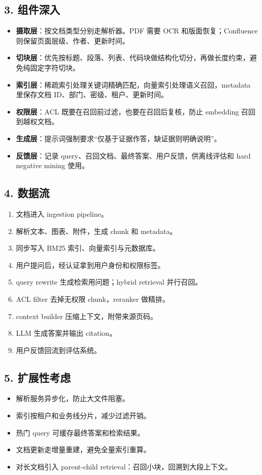 \subsection{3. 组件深入}
\begin{itemize}[leftmargin=2em]
\item \textbf{摄取层}：按文档类型分别走解析器。PDF 需要 OCR 和版面恢复；Confluence 则保留页面层级、作者、更新时间。
\item \textbf{切块层}：优先按标题、段落、列表、代码块做结构化切分，再做长度约束，避免纯固定字符切块。
\item \textbf{索引层}：稀疏索引处理关键词精确匹配，向量索引处理语义召回，metadata 里保存文档 ID、部门、密级、租户、更新时间。
\item \textbf{权限层}：ACL 既要在召回前过滤，也要在召回后复核，防止 embedding 召回到越权文档。
\item \textbf{生成层}：提示词强制要求``仅基于证据作答，缺证据则明确说明''。
\item \textbf{反馈层}：记录 query、召回文档、最终答案、用户反馈，供离线评估和 hard negative mining 使用。
\end{itemize}

\subsection{4. 数据流}
\begin{enumerate}[leftmargin=2em]
\item 文档进入 ingestion pipeline。
\item 解析文本、图表、附件，生成 chunk 和 metadata。
\item 同步写入 BM25 索引、向量索引与元数据库。
\item 用户提问后，经认证拿到用户身份和权限标签。
\item query rewrite 生成检索用问题；hybrid retrieval 并行召回。
\item ACL filter 去掉无权限 chunk，reranker 做精排。
\item context builder 压缩上下文，附带来源页码。
\item LLM 生成答案并输出 citation。
\item 用户反馈回流到评估系统。
\end{enumerate}

\subsection{5. 扩展性考虑}
\begin{itemize}[leftmargin=2em]
\item 解析服务异步化，防止大文件阻塞。
\item 索引按租户和业务线分片，减少过滤开销。
\item 热门 query 可缓存最终答案和检索结果。
\item 文档更新走增量重建，避免全量索引重算。
\item 对长文档引入 parent-child retrieval：召回小块，回溯到大段上下文。
\end{itemize}


